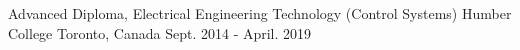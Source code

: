


\begin{cventries}


\cventry
{Advanced Diploma, Electrical Engineering Technology (Control Systems)} %
{Humber College} %
{Toronto, Canada} %
{Sept. 2014 - April. 2019} %
{}



\end{cventries}